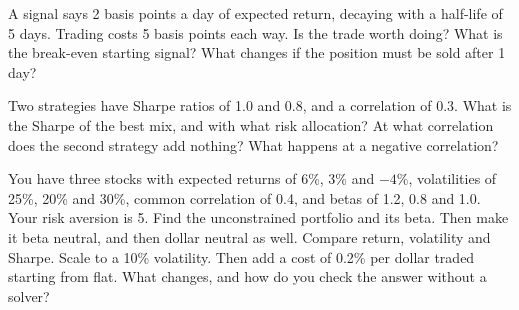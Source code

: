 \begin{question}\label{iq:iv2:portfolio-construction:23}
A signal says 2 basis points a day of expected return, decaying with a half-life of 5 days. Trading costs 5 basis points each way. Is the trade worth doing? What is the break-even starting signal? What changes if the position must be sold after 1 day?
\end{question}

\begin{question}\label{iq:iv2:portfolio-construction:24}
Two strategies have Sharpe ratios of 1.0 and 0.8, and a correlation of 0.3. What is the Sharpe of the best mix, and with what risk allocation? At what correlation does the second strategy add nothing? What happens at a negative correlation?
\end{question}

\begin{question}\label{iq:iv2:portfolio-construction:25}
You have three stocks with expected returns of 6\%, 3\% and $-4\%$, volatilities of 25\%, 20\% and 30\%, common correlation of 0.4, and betas of 1.2, 0.8 and 1.0. Your risk aversion is 5. Find the unconstrained portfolio and its beta. Then make it beta neutral, and then dollar neutral as well. Compare return, volatility and Sharpe. Scale to a 10\% volatility. Then add a cost of 0.2\% per dollar traded starting from flat. What changes, and how do you check the answer without a solver?
\end{question}
